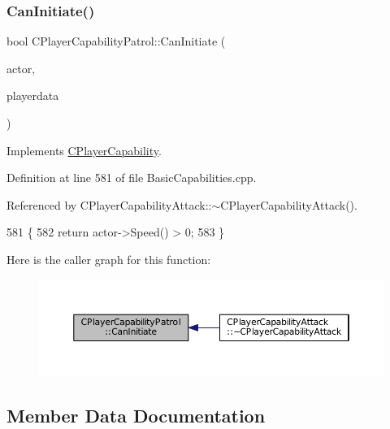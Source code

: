 \subsubsection{\texorpdfstring{Can\+Initiate()}{CanInitiate()}}
{\footnotesize\ttfamily bool C\+Player\+Capability\+Patrol\+::\+Can\+Initiate (\begin{DoxyParamCaption}\item[{std\+::shared\+\_\+ptr$<$ \hyperlink{classCPlayerAsset}{C\+Player\+Asset} $>$}]{actor,  }\item[{std\+::shared\+\_\+ptr$<$ \hyperlink{classCPlayerData}{C\+Player\+Data} $>$}]{playerdata }\end{DoxyParamCaption})\hspace{0.3cm}{\ttfamily [virtual]}}



Implements \hyperlink{classCPlayerCapability_aa83b1e1fcaff2985c378132d679154ea}{C\+Player\+Capability}.



Definition at line 581 of file Basic\+Capabilities.\+cpp.



Referenced by C\+Player\+Capability\+Attack\+::$\sim$\+C\+Player\+Capability\+Attack().


\begin{DoxyCode}
581                                                                                                            
                \{
582     \textcolor{keywordflow}{return} actor->Speed() > 0;
583 \}
\end{DoxyCode}
Here is the caller graph for this function\+:\nopagebreak
\begin{figure}[H]
\begin{center}
\leavevmode
\includegraphics[width=350pt]{classCPlayerCapabilityPatrol_a48e60ecd544759f3aad66afeb4a6e0a9_icgraph}
\end{center}
\end{figure}


\subsection{Member Data Documentation}
\hypertarget{classCPlayerCapabilityPatrol_af3e88478d9266aa4c7f2f0457da84e89}{}\label{classCPlayerCapabilityPatrol_af3e88478d9266aa4c7f2f0457da84e89} 
